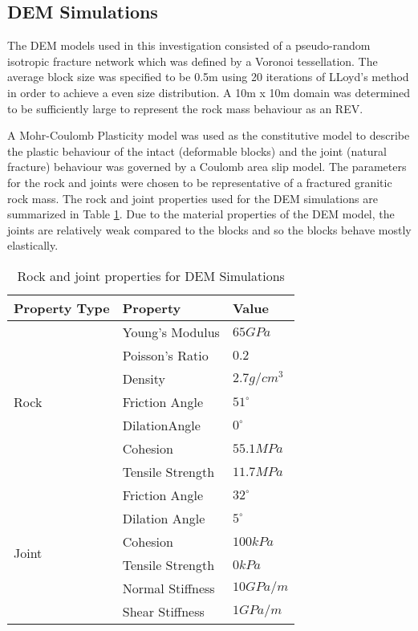 \subsection{DEM Simulations}

The DEM models used in this investigation consisted of a pseudo-random isotropic fracture network which was defined by a Voronoi tessellation. The average block size was specified to be 0.5m using 20 iterations of LLoyd's method \citep{Lloyd_1982} in order to achieve a even size distribution. A 10m x 10m domain was determined to be sufficiently large to represent the rock mass behaviour as an REV. 

A Mohr-Coulomb Plasticity model was used as the constitutive model to describe the plastic behaviour of the intact  (deformable blocks) and the joint (natural fracture) behaviour was governed by a Coulomb area slip model. The parameters for the rock and joints were chosen to be representative of a fractured granitic rock mass. The rock and joint properties used for the DEM simulations are summarized in Table \ref{tab:demProp}. Due to the material properties of the DEM model, the joints are relatively weak compared to the blocks and so the blocks behave mostly elastically. 

\begin{table}[!htbp]
\centering
\caption{Rock and joint properties for DEM Simulations}
\label{tab:demProp}
\begin{tabular}{@{}lll@{}}
\toprule
Property Type          & Property         & Value        \\ \midrule
\multirow{7}{*}{Rock}  & Young's Modulus  & $65 GPa$     \\
                       & Poisson's Ratio  & $0.2$        \\
                       & Density          & $2.7 g/cm^3$ \\
                       & Friction Angle   & $51^{\circ}$ \\
                       & DilationAngle    & $0^{\circ}$  \\
                       & Cohesion         & $55.1 MPa$   \\
                       & Tensile Strength & $11.7 MPa$   \\ \cmidrule(r){1-1}
\multirow{6}{*}{Joint} & Friction Angle   & $32^{\circ}$ \\
                       & Dilation Angle   & $5^{\circ}$  \\
                       & Cohesion         & $100 kPa$    \\
                       & Tensile Strength & $0 kPa$      \\
                       & Normal Stiffness & $10 GPa/m$   \\
                       & Shear Stiffness  & $1 GPa/m$    \\ \bottomrule
\end{tabular}
\end{table}


